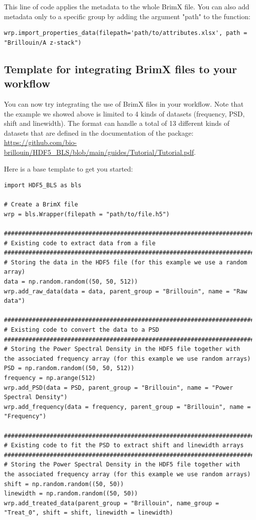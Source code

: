 \documentclass{article}
\begin{document}
This line of code applies the metadata to the whole BrimX file. You can also add metadata only to a specific group by adding the argument "path" to the function:

\begin{lstlisting}
wrp.import_properties_data(filepath='path/to/attributes.xlsx', path = "Brillouin/A z-stack")
\end{lstlisting}


\subsection{Template for integrating BrimX files to your workflow}

You can now try integrating the use of BrimX files in your workflow. Note that the example we showed above is limited to 4 kinds of datasets (frequency, PSD, shift and linewidth). The format can handle a total of 13 different kinds of datasets that are defined in the documentation of the package: \url{https://github.com/bio-brillouin/HDF5_BLS/blob/main/guides/Tutorial/Tutorial.pdf}.

Here is a base template to get you started:

\begin{lstlisting}
import HDF5_BLS as bls

# Create a BrimX file
wrp = bls.Wrapper(filepath = "path/to/file.h5")

###############################################################################
# Existing code to extract data from a file
###############################################################################
# Storing the data in the HDF5 file (for this example we use a random array)
data = np.random.random((50, 50, 512))
wrp.add_raw_data(data = data, parent_group = "Brillouin", name = "Raw data")

###############################################################################
# Existing code to convert the data to a PSD
###############################################################################
# Storing the Power Spectral Density in the HDF5 file together with the associated frequency array (for this example we use random arrays)
PSD = np.random.random((50, 50, 512))
frequency = np.arange(512)
wrp.add_PSD(data = PSD, parent_group = "Brillouin", name = "Power Spectral Density")
wrp.add_frequency(data = frequency, parent_group = "Brillouin", name = "Frequency")

###############################################################################
# Existing code to fit the PSD to extract shift and linewidth arrays
###############################################################################
# Storing the Power Spectral Density in the HDF5 file together with the associated frequency array (for this example we use random arrays)
shift = np.random.random((50, 50))
linewidth = np.random.random((50, 50))
wrp.add_treated_data(parent_group = "Brillouin", name_group = "Treat_0", shift = shift, linewidth = linewidth)
\end{lstlisting}
\end{document}
